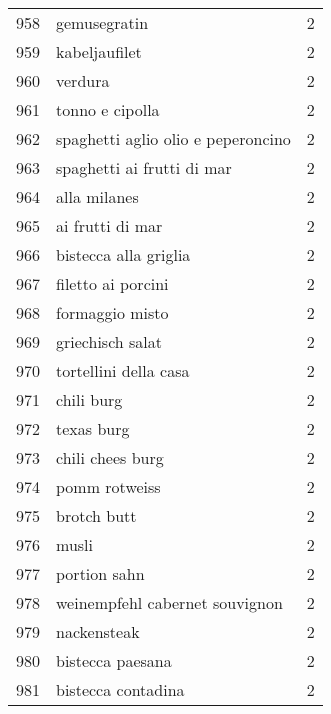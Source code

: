 \begin{tabular}{llr}
958  &                                       gemusegratin &      2 \\
959  &                                      kabeljaufilet &      2 \\
960  &                                            verdura &      2 \\
961  &                                    tonno e cipolla &      2 \\
962  &                 spaghetti aglio olio e peperoncino &      2 \\
963  &                         spaghetti ai frutti di mar &      2 \\
964  &                                       alla milanes &      2 \\
965  &                                   ai frutti di mar &      2 \\
966  &                              bistecca alla griglia &      2 \\
967  &                                 filetto ai porcini &      2 \\
968  &                                    formaggio misto &      2 \\
969  &                                   griechisch salat &      2 \\
970  &                              tortellini della casa &      2 \\
971  &                                         chili burg &      2 \\
972  &                                         texas burg &      2 \\
973  &                                   chili chees burg &      2 \\
974  &                                      pomm rotweiss &      2 \\
975  &                                        brotch butt &      2 \\
976  &                                              musli &      2 \\
977  &                                       portion sahn &      2 \\
978  &                     weinempfehl cabernet souvignon &      2 \\
979  &                                        nackensteak &      2 \\
980  &                                   bistecca paesana &      2 \\
981  &                                 bistecca contadina &      2 \\

\end{tabular}
